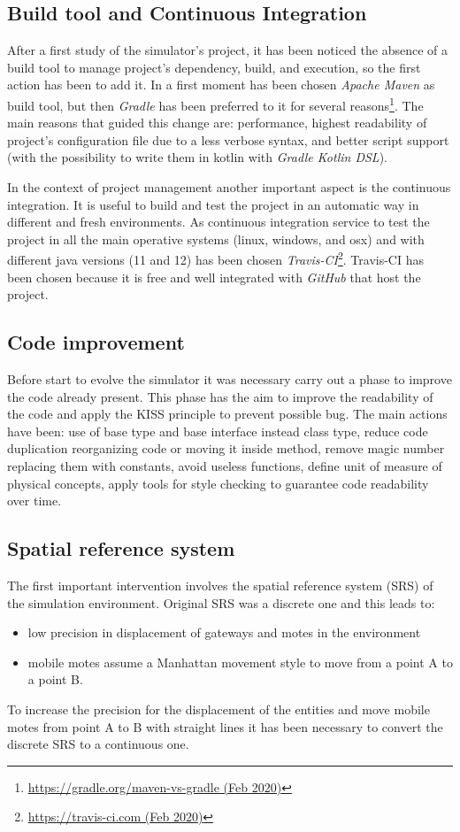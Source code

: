 \subsection{Build tool and Continuous Integration}
After a first study of the simulator's project, it has been noticed the absence of a build tool to manage project's dependency, build, and execution, so the first action has been to add it. 
In a first moment has been chosen \textit{Apache Maven} as build tool, but then \textit{Gradle} has been preferred to it for several reasons\footnote{ \href{https://gradle.org/maven-vs-gradle/}{https://gradle.org/maven-vs-gradle (Feb 2020)}}. The main reasons that guided this change are: performance, highest readability of project's configuration file due to a less verbose syntax, and better script support (with the possibility to write them in kotlin with \textit{Gradle Kotlin DSL}). 

In the context of project management another important aspect is the continuous integration.
It is useful to build and test the project in an automatic way in different and fresh environments. 
As continuous integration service to test the project in all the main operative systems (linux, windows, and osx) and with different java versions (11 and 12) has been chosen \textit{Travis-CI}\footnote{\href{https://travis-ci.com/}{https://travis-ci.com (Feb 2020)}}.
Travis-CI has been chosen because it is free and well integrated with \textit{GitHub} that host the project.

\subsection{Code improvement}
Before start to evolve the simulator it was necessary carry out a phase to improve the code already present. 
This phase has the aim to improve the readability of the code and apply the KISS principle to prevent possible bug.
The main actions have been: use of base type and base interface instead class type, reduce code duplication reorganizing code or moving it inside method, remove magic number replacing them with constants, avoid useless functions, define unit of measure of physical concepts, apply tools for style checking to guarantee code readability over time.

\subsection{Spatial reference system}
The first important intervention involves the spatial reference system (SRS) of the simulation environment. Original SRS was a discrete one and this leads to:
\begin{itemize}
    \item low precision in displacement of gateways and motes in the environment
    \item mobile motes assume a Manhattan movement style to move from a point A to a point B. 
\end{itemize}  
To increase the precision for the displacement of the entities and move mobile motes from point A to B with straight lines it has been necessary to convert the discrete SRS to a continuous one. 

